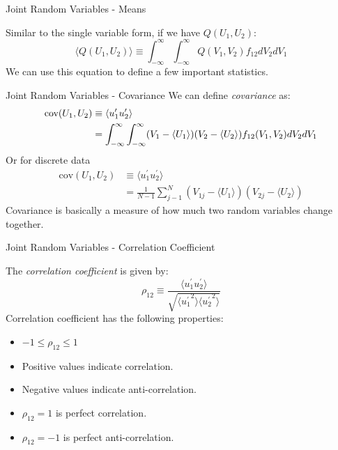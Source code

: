 
\begin{frame}{Joint Random Variables - Means}
  
  Similar to the single variable form, if we have $Q(U_1,U_2)$:
  $$\langle Q(U_1,U_2) \rangle \equiv \int^{\infty}_{-\infty} \int^{\infty}_{-\infty} Q(V_1,V_2)f_{12}dV_2dV_1$$
  We can use this equation to define a few important statistics.
  
\end{frame}


\begin{frame}{Joint Random Variables - Covariance}
  We can define \textit{covariance} as:
  \begin{align*}
  \text{cov}(U_1,U_2) &\equiv \newline \langle u_1^\prime u_2^\prime \rangle \\ &= \int^{\infty}_{-\infty} \int^{\infty}_{-\infty}(V_1 - \langle U_1 \rangle)(V_2 - \langle U_2 \rangle) f_{12}(V_1,V_2)dV_2dV_1
  \end{align*}
  Or for discrete data
  \begin{align*}
  \text{cov}(U_1,U_2) &\equiv \langle u_1^\prime u_2^\prime \rangle \\ &= \frac{1}{N-1} \sum^N_{j-1} (V_{1j} - \langle U_1 \rangle)(V_{2j} - \langle U_2 \rangle)
  \end{align*}
  Covariance is basically a measure of how much two random variables change together.
\end{frame}


\begin{frame}{Joint Random Variables - Correlation Coefficient}
  
  The \textit{correlation coefficient} is given by:
  $$\rho_{12} \equiv \frac{\langle u_1^\prime u_2^\prime \rangle}{\sqrt{\langle {u_1^\prime}^2\rangle \langle {u_2^\prime}^2 \rangle}}$$
  Correlation coefficient has the following properties:
  \begin{itemize}
  	\item $-1 \leq \rho_{12} \leq 1$
  	\item Positive values indicate correlation.
  	\item Negative values indicate anti-correlation.
  	\item $\rho_{12} = 1$ is perfect correlation.
  	\item $\rho_{12} = -1$ is perfect anti-correlation.
  \end{itemize}
\end{frame}

